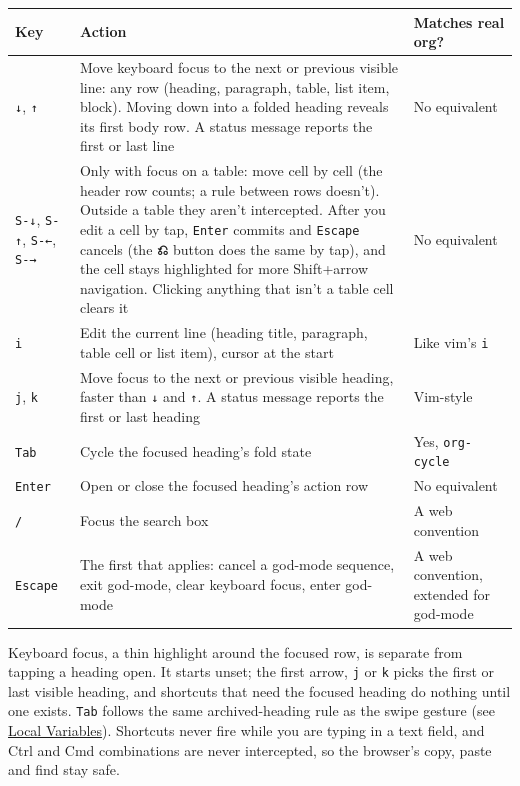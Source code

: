 \documentclass[11pt]{article}
\begin{document}
\begin{center}
\begin{tabular}{lll}
Key & Action & Matches real org?\\[0pt]
\hline
\texttt{↓}, \texttt{↑} & Move keyboard focus to the next or previous visible line: any row (heading, paragraph, table, list item, block). Moving down into a folded heading reveals its first body row. A status message reports the first or last line & No equivalent\\[0pt]
\texttt{S-↓}, \texttt{S-↑}, \texttt{S-←}, \texttt{S-→} & Only with focus on a table: move cell by cell (the header row counts; a rule between rows doesn't). Outside a table they aren't intercepted. After you edit a cell by tap, \texttt{Enter} commits and \texttt{Escape} cancels (the \textbf{⎌} button does the same by tap), and the cell stays highlighted for more Shift+arrow navigation. Clicking anything that isn't a table cell clears it & No equivalent\\[0pt]
\texttt{i} & Edit the current line (heading title, paragraph, table cell or list item), cursor at the start & Like vim's \texttt{i}\\[0pt]
\texttt{j}, \texttt{k} & Move focus to the next or previous visible heading, faster than \texttt{↓} and \texttt{↑}. A status message reports the first or last heading & Vim-style\\[0pt]
\texttt{Tab} & Cycle the focused heading's fold state & Yes, \texttt{org-cycle}\\[0pt]
\texttt{Enter} & Open or close the focused heading's action row & No equivalent\\[0pt]
\texttt{/} & Focus the search box & A web convention\\[0pt]
\texttt{Escape} & The first that applies: cancel a god-mode sequence, exit god-mode, clear keyboard focus, enter god-mode & A web convention, extended for god-mode\\[0pt]
\end{tabular}
\end{center}

Keyboard focus, a thin highlight around the focused row, is separate from tapping a heading open. It starts unset; the first arrow, \texttt{j} or \texttt{k} picks the first or last visible heading, and shortcuts that need the focused heading do nothing until one exists. \texttt{Tab} follows the same archived-heading rule as the swipe gesture (see \hyperref[sec:org761a631]{Local Variables}). Shortcuts never fire while you are typing in a text field, and Ctrl and Cmd combinations are never intercepted, so the browser's copy, paste and find stay safe.
\end{document}
